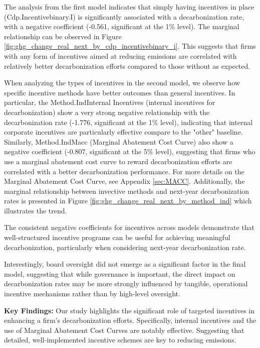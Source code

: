 The analysis from the first model indicates that simply having incentives in place (Cdp.Incentivebinary.I) is significantly associated with a decarbonization rate, with a negative coefficient (-0.561, significant at the 1\% level). The marginal relationship can be observed in Figure \ref{fig:ghg_change_real_next_by_cdp_incentivebinary_i}. This suggests that firms with any form of incentives aimed at reducing emissions are correlated with relatively better decarbonization efforts compared to those without as expected.


When analyzing the types of incentives in the second model, we observe how specific incentive methods have better outcomes than general incentives. In particular, the Method.IndInternal Incentives (internal incentives for decarbonization) show a very strong negative relationship with the decarbonization rate (-1.776, significant at the 1\% level), indicating that internal corporate incentives are particularly effective compare to the "other" baseline. Similarly, Method.IndMacc (Marginal Abatement Cost Curve) also show a negative coefficient (-0.807, significant at the 5\% level), suggesting that firms who use a marginal abatement cost curve to reward decarbonization efforts are correlated with a better decarbonization performance. For more details on the Marginal Abatement Cost Curve, see Appendix \ref{sec:MACC}. Additionally, the marginal relationship between invective methods and next-year decarbonization rates is presented in Figure \ref{fig:ghg_change_real_next_by_method_ind} which illustrates the trend.


The consistent negative coefficients for incentives across models demonstrate that well-structured incentive programs can be useful for achieving meaningful decarbonization, particularly when considering next-year decarbonization rate.


Interestingly, board oversight did not emerge as a significant factor in the final model, suggesting that while governance is important, the direct impact on decarbonization rates may be more strongly influenced by tangible, operational incentive mechanisms rather than  by high-level oversight.


\textbf{Key Findings:} Our study highlights the significant role of targeted incentives in enhancing a firm's decarbonization efforts. Specifically, internal incentives and the use of Marginal Abatement Cost Curves are notably effective. Suggesting that detailed, well-implemented incentive schemes are key to reducing emissions.




